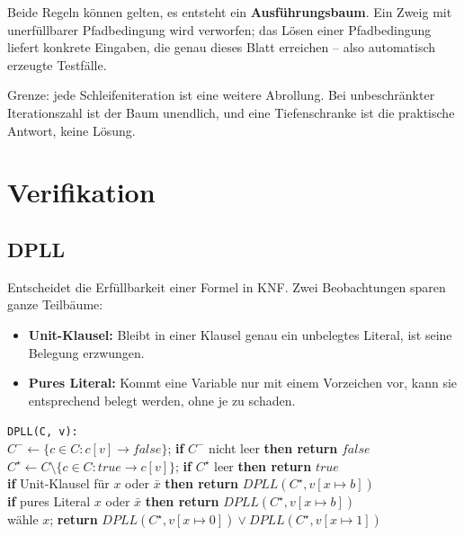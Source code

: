 \documentclass[12pt, a4paper]{article}
\begin{document}
Beide Regeln können gelten, es entsteht ein \textbf{Ausführungsbaum}. Ein Zweig mit
unerfüllbarer Pfadbedingung wird verworfen; das Lösen einer Pfadbedingung liefert
konkrete Eingaben, die genau dieses Blatt erreichen -- also automatisch erzeugte
Testfälle.

Grenze: jede Schleifeniteration ist eine weitere Abrollung. Bei unbeschränkter
Iterationszahl ist der Baum unendlich, und eine Tiefenschranke ist die praktische
Antwort, keine Lösung.

\section{Verifikation}

\subsection{DPLL}

Entscheidet die Erfüllbarkeit einer Formel in KNF. Zwei Beobachtungen sparen ganze
Teilbäume:

\begin{itemize}
  \item \textbf{Unit-Klausel:} Bleibt in einer Klausel genau ein unbelegtes Literal,
        ist seine Belegung erzwungen.
  \item \textbf{Pures Literal:} Kommt eine Variable nur mit einem Vorzeichen vor, kann
        sie entsprechend belegt werden, ohne je zu schaden.
\end{itemize}

\begin{center}
\begin{minipage}{0.92\textwidth}
\small
\texttt{DPLL(C, v):}\\
\hspace*{1em}$C^- \leftarrow \{c \in C : c[v] \to false\}$;
\textbf{if} $C^-$ nicht leer \textbf{then return} $false$\\
\hspace*{1em}$C^\star \leftarrow C \setminus \{c \in C : true \to c[v]\}$;
\textbf{if} $C^\star$ leer \textbf{then return} $true$\\
\hspace*{1em}\textbf{if} Unit-Klausel für $x$ oder $\bar{x}$ \textbf{then return}
$DPLL(C^\star, v[x \mapsto b])$\\
\hspace*{1em}\textbf{if} pures Literal $x$ oder $\bar{x}$ \textbf{then return}
$DPLL(C^\star, v[x \mapsto b])$\\
\hspace*{1em}wähle $x$; \textbf{return} $DPLL(C^\star, v[x \mapsto 0]) \vee DPLL(C^\star, v[x \mapsto 1])$
\end{minipage}
\end{center}
\end{document}
